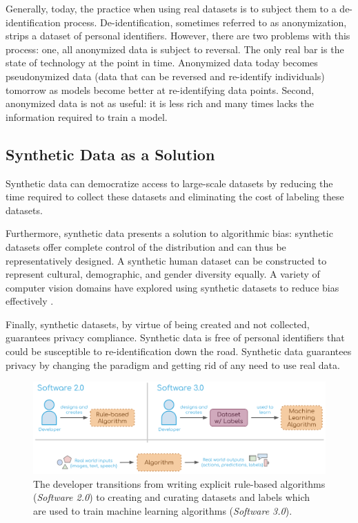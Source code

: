 \documentclass{article}
\begin{document}
Generally, today, the practice when using real datasets is to subject them to a de-identification process. De-identification, sometimes referred to as anonymization, strips a dataset of personal identifiers. However, there are two problems with this process: one, all anonymized data is subject to reversal. The only real bar is the state of technology at the point in time. Anonymized data today becomes pseudonymized data (data that can be reversed and re-identify individuals) tomorrow as models become better at re-identifying data points. Second, anonymized data is not as useful: it is less rich and many times lacks the information required to train a model. 

\subsection{Synthetic Data as a Solution}

Synthetic data can democratize access to large-scale datasets by reducing the time required to collect these datasets and eliminating the cost of labeling these datasets.

Furthermore, synthetic data presents a solution to algorithmic bias: synthetic datasets offer complete control of the distribution and can thus be representatively designed. A synthetic human dataset can be constructed to represent cultural, demographic, and gender diversity equally.  A variety of computer vision domains have explored using synthetic datasets to reduce bias effectively \cite{DBLP:journals/corr/abs-2004-13866}.

Finally, synthetic datasets, by virtue of being created and not collected, guarantees privacy compliance. Synthetic data is free of personal identifiers that could be susceptible to re-identification down the road. Synthetic data guarantees privacy by changing the paradigm and getting rid of any need to use real data.

\begin{figure}
	\centering
	\includegraphics[width=\textwidth]{software3.png}
	\caption{The developer transitions from writing explicit rule-based algorithms (\emph{Software 2.0}) to creating and curating datasets and labels which are used to train machine learning algorithms (\emph{Software 3.0}).}
	\label{fig:fig2}
\end{figure}
\end{document}
